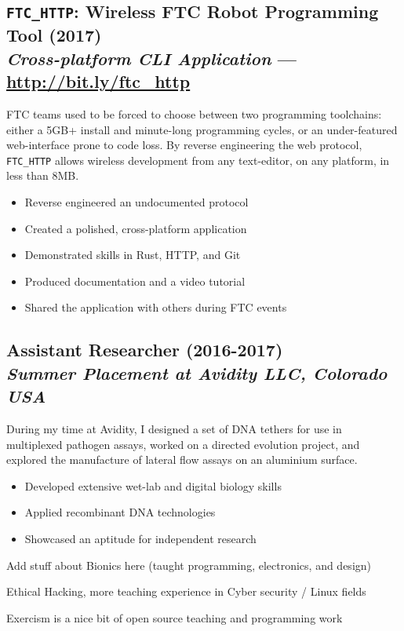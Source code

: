 \documentclass[twocolumn, a4paper, fontsize=9pt, headsepline, footsepline]{scrartcl}
\begin{document}
\subsection*{\textbf{\texttt{FTC\_HTTP}}: Wireless FTC Robot Programming Tool
  (2017)\\\textmd{\emph{Cross-platform CLI Application} — \url{http://bit.ly/ftc_http}}}
\noindent
FTC teams used to be forced to choose between two programming toolchains: either
a 5GB+ install and minute-long programming cycles, or an under-featured
web-interface prone to code loss. By reverse engineering the web protocol,
\texttt{FTC\_HTTP} allows wireless development from any text-editor, on any platform, in
less than 8MB.
\begin{itemize}
\item Reverse engineered an undocumented protocol
\item Created a polished, cross-platform application
\item Demonstrated skills in Rust, HTTP, and Git
\item Produced documentation and a video tutorial
\item Shared the application with others during FTC events
\end{itemize}

\subsection*{Assistant Researcher (2016-2017)\\\textmd{\emph{Summer Placement at Avidity LLC, Colorado USA}}}
\noindent
During my time at Avidity, I designed a set of DNA tethers for use in
multiplexed pathogen assays, worked on a directed evolution project, and
explored the manufacture of lateral flow assays on an aluminium surface.
\begin{itemize}
\item Developed extensive wet-lab and digital biology skills
\item Applied recombinant DNA technologies
\item Showcased an aptitude for independent research
\end{itemize}


Add stuff about Bionics here (taught programming, electronics, and design)

Ethical Hacking, more teaching experience in Cyber security / Linux fields

Exercism is a nice bit of open source teaching and programming work
\end{document}
